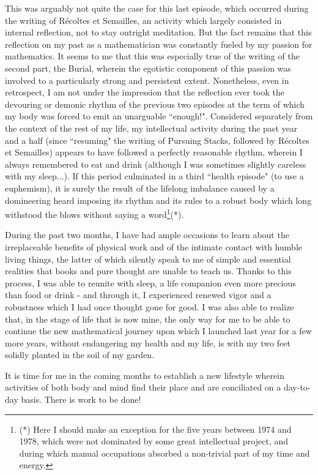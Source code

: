 This was arguably not quite the case for this last episode, which occurred during the writing of R\'ecoltes et Semailles, an activity which largely consisted in internal reflection, not to stay outright meditation. But the fact remains that this reflection on my past as a mathematician was constantly fueled by my passion for mathematics. It seems to me that this was especially true of the writing of the second part, the Burial, wherein the egotistic component of this passion was involved to a particularly strong and persistent extent. Nonetheless, even in retrospect, I am not under the impression that the reflection ever took the devouring or demonic rhythm of the previous two episodes at the term of which my body was forced to emit an unarguable ``enough!". Considered separately from the context of the rest of my life, my intellectual activity during the past year and a half (since ``resuming" the writing of Pursuing Stacks, followed by R\'ecoltes et Semailles) appears to have followed a perfectly reasonable rhythm, wherein I always remembered to eat and drink (although I was sometimes slightly careless with my sleep...). If this period culminated in a third ``health episode" (to use a euphemism), it is surely the result of the lifelong imbalance caused by a domineering heard imposing its rhythm and its rules to a robust body which long withstood the blows without saying a word\footnote{(*) Here I should make an exception for the five years between 1974 and 1978, which were not dominated by some great intellectual project, and during which manual occupations absorbed a non-trivial part of my time and energy.}(*).

During the past two months, I have had ample occasions to learn about the irreplaceable benefits of physical work and of the intimate contact with humble living things, the latter of which silently speak to me of simple and essential realities that books and pure thought are unable to teach us. Thanks to this process, I was able to reunite with sleep, a life companion even more precious than food or drink - and through it, I experienced renewed vigor and a robustness which I had once thought gone for good. I was also able to realize that, in the stage of life that is now mine, the only way for me to be able to continue the new mathematical journey upon which I launched last year for a few more years, without endangering my health and my life, is with my two feet solidly planted in the soil of my garden.

It is time for me in the coming months to establish a new lifestyle wherein activities of both body and mind find their place and are conciliated on a day-to-day basis. There is work to be done!


